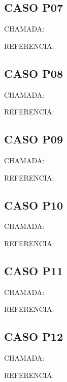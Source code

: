 \documentclass{undftex}
\begin{document}
\begin{refsection}\section*{CASO P07}\noindent CHAMADA: \par\noindent REFERENCIA:\par\printbibliography[heading=none]\end{refsection}\clearpage
\begin{refsection}\section*{CASO P08}\noindent CHAMADA: \par\noindent REFERENCIA:\par\printbibliography[heading=none]\end{refsection}\clearpage
\begin{refsection}\section*{CASO P09}\noindent CHAMADA: \par\noindent REFERENCIA:\par\printbibliography[heading=none]\end{refsection}\clearpage
\begin{refsection}\section*{CASO P10}\noindent CHAMADA: \par\noindent REFERENCIA:\par\printbibliography[heading=none]\end{refsection}\clearpage
\begin{refsection}\section*{CASO P11}\noindent CHAMADA: \par\noindent REFERENCIA:\par\printbibliography[heading=none]\end{refsection}\clearpage
\begin{refsection}\section*{CASO P12}\noindent CHAMADA: \par\noindent REFERENCIA:\par\printbibliography[heading=none]\end{refsection}\clearpage
\end{document}
